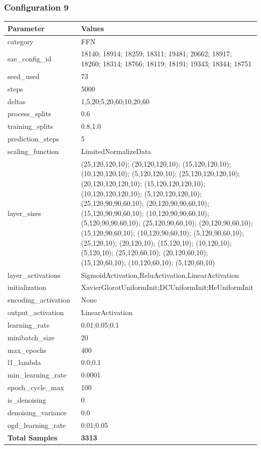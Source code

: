 \documentclass[a4paper,11pt,oneside]{article}
\theoremstyle{plain}
\theoremstyle{definition}
\begin{document}
	\newpage
	\subsubsection{Configuration 9}\label{config9}
	\begin{longtable}[H]{|p{0.3\linewidth}|p{0.7\linewidth}|} \hline \textbf{Parameter} &\textbf{Values} \\\hline{category} & {FFN} \\\hline
		{sae\_config\_id} & {18140; 18914; 18259; 18311; 19481; 20662; 18917; 18260; 18314; 18766; 18119; 18191; 19343; 18344; 18751} \\\hline
		{seed\_used} & {73} \\\hline
		{steps} & {5000} \\\hline
		{deltas} & {1,5,20;5,20,60;10,20,60} \\\hline
		{process\_splits} & {0.6} \\\hline
		{training\_splits} & {0.8,1.0} \\\hline
		{prediction\_steps} & {5} \\\hline
		{scaling\_function} & {LimitedNormalizeData} \\\hline
		{layer\_sizes} & {(25,120,120,10); (20,120,120,10); (15,120,120,10); (10,120,120,10); (5,120,120,10); (25,120,120,120,10); (20,120,120,120,10); (15,120,120,120,10); (10,120,120,120,10); (5,120,120,120,10); (25,120,90,90,60,10); (20,120,90,90,60,10); (15,120,90,90,60,10); (10,120,90,90,60,10); (5,120,90,90,60,10); (25,120,90,60,10); (20,120,90,60,10); (15,120,90,60,10); (10,120,90,60,10); (5,120,90,60,10); (25,120,10); (20,120,10); (15,120,10); (10,120,10); (5,120,10); (25,120,60,10); (20,120,60,10); (15,120,60,10); (10,120,60,10); (5,120,60,10)} \\\hline
		{layer\_activations} & {SigmoidActivation,ReluActivation,LinearActivation} \\\hline
		{initialization} & {XavierGlorotUniformInit;DCUniformInit;HeUniformInit} \\\hline
		{encoding\_activation} & {None} \\\hline
		{output\_activation} & {LinearActivation} \\\hline
		{learning\_rate} & {0.01;0.05;0.1} \\\hline
		{minibatch\_size} & {20} \\\hline
		{max\_epochs} & {400} \\\hline
		{l1\_lambda} & {0.0;0.1} \\\hline
		{min\_learning\_rate} & {0.0001} \\\hline
		{epoch\_cycle\_max} & {100} \\\hline
		{is\_denoising} & {0} \\\hline
		{denoising\_variance} & {0.0} \\\hline
		{ogd\_learning\_rate} & {0.01;0.05} \\\hline
		{\textbf{Total Samples}} & {\textbf{3313}} \\\hline
	\end{longtable}
	
\end{document}
